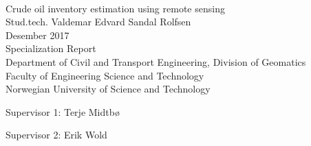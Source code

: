 
\thispagestyle{empty}
\mbox{}\\[6pc]
\begin{center}
\Huge{Crude oil inventory estimation using remote sensing}\\[2pc]

\Large{Stud.tech. Valdemar Edvard Sandal Rolfsen}\\[1pc]
\large{Desember 2017}\\[2pc]

Specialization Report\\
Department of Civil and Transport Engineering, Division of Geomatics\\
Faculty of Engineering Science and Technology \\
Norwegian University of Science and Technology
\end{center}
\vfill

\noindent Supervisor 1: Terje Midtbø

\noindent Supervisor 2: Erik Wold

